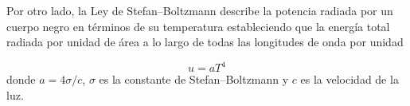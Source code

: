 \documentclass{article}
\begin{document}
Por otro lado, la Ley de Stefan–Boltzmann describe la potencia radiada por un
cuerpo negro en términos de su temperatura estableciendo que la energía total
radiada por unidad de área a lo largo de todas las longitudes de onda por
unidad

\begin{equation}\label{eq:ley-stefan-boltzmann}
u = aT^{4}
\end{equation}
donde $a =4 \sigma/c$, $\sigma$ es la constante de Stefan–Boltzmann y $c$ es la
velocidad de la luz. 








\end{document}
